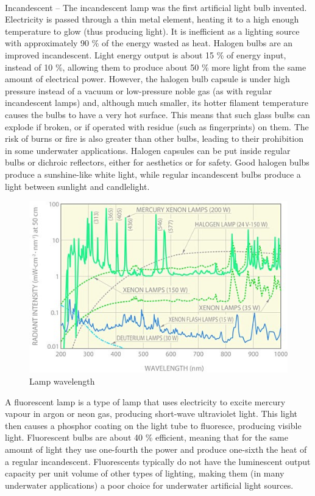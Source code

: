 \\
Incandescent – The incandescent lamp was the first artificial light bulb invented.
Electricity is passed through a thin metal element, heating it to a high enough temperature to glow (thus producing light). It is inefficient as a lighting source with approximately 90 \% of the energy wasted as heat. Halogen bulbs are an improved incandescent. Light energy output is about 15 \% of energy input,  instead of 10 \%, allowing them to produce about 50 \% more light from the same amount of electrical power. However, the halogen bulb capsule is under high pressure instead of a vacuum or low-pressure noble gas (as with regular
incandescent lamps) and, although much smaller, its hotter filament temperature causes the bulbs to have a very hot surface. This means that such glass bulbs can explode if broken, or if operated with residue (such as fingerprints) on them. The risk of burns or fire is also greater than other bulbs, leading to their prohibition in
some underwater applications. Halogen capsules can be put inside regular bulbs or dichroic reflectors, either for aesthetics or for safety. Good halogen bulbs produce a sunshine-like white light, while regular incandescent bulbs produce a light between sunlight and candlelight.

\begin{figure}[htb]
\centering
\includegraphics[scale=1]{figures/camera/bh7.jpg}
\caption{Lamp wavelength}
\end{figure}

A fluorescent lamp is a type of lamp that uses electricity to excite
mercury vapour in argon or neon gas, producing short-wave ultraviolet light. This light then causes a phosphor coating on the light tube to fluoresce, producing visible light. Fluorescent bulbs are about 40 \% efficient, meaning that for the same amount of light they use one-fourth the power and produce one-sixth the heat of a regular incandescent. Fluorescents typically do not have the luminescent output capacity per unit volume of other types of lighting, making them (in many underwater applications) a poor choice for underwater artificial light sources.

